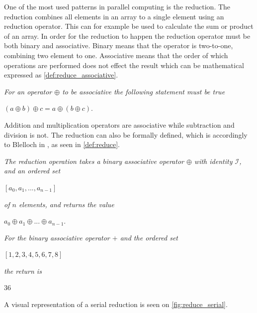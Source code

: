 One of the most used patterns in parallel computing is the reduction. The reduction combines all elements in an array to a single element using an reduction operator. This can for example be used to calculate the sum or product of an array. In order for the reduction to happen the reduction operator must be both binary and associative. Binary means that the operator is two-to-one, combining two element to one. Associative means that the order of which operations are performed does not effect the result which can be mathematical expressed as \cref{def:reduce_associative}.

\begin{definition} 
\label{def:reduce_associative}
\textit{For an operator $\oplus$ to be associative the following statement must be true}
\begin{center}
	$(a \oplus b) \oplus c = a \oplus (b \oplus c).$
\end{center}
\end{definition}

\noindent Addition and multiplication operators are associative while subtraction and division is not. The reduction can also be formally defined, which is accordingly to Blelloch in \cite{BlellochTR90}, as seen in \cref{def:reduce}.

\begin{definition} 
	\label{def:reduce}
	\textit{The reduction operation takes a binary associative operator $\oplus$ with identity $\mathcal{I}$, and an ordered set}
	\begin{center}
		$[a_0, a_1,...,a_{n-1}]$ 
	\end{center}
	\textit{of $n$ elements, and returns the value}
	\begin{center}
		$a_0 \oplus a_1 \oplus ... \oplus a_{n-1}.$
	\end{center}
\end{definition}
\begin{example}
	\textit{For the binary associative operator $+$ and the ordered set}
	\begin{center}
		$[1,2,3,4,5,6,7,8]$ 
	\end{center}
	\textit{the return is}
	\begin{center}
		$36$
	\end{center}
	\end{example}

A visual representation of a serial reduction is seen on \cref{fig:reduce_serial}. 

